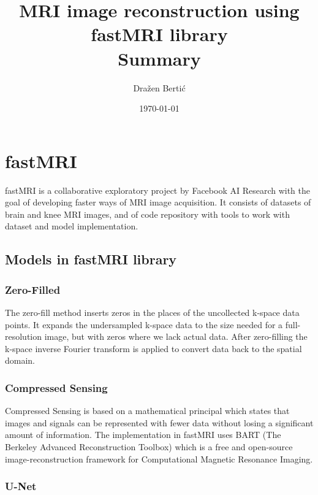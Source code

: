 \documentclass[10pt,a4paper]{article}
\begin{document}
\title{MRI image reconstruction using fastMRI library \\ \vspace{0.5cm} \large Summary}
\author{Dražen Bertić}
\date{\today} %

\maketitle

\section{fastMRI}

fastMRI is a collaborative exploratory project by Facebook AI Research with the goal of developing faster ways of MRI image acquisition. It consists of datasets of brain and knee MRI images, and of code repository with tools to work with dataset and model implementation.

\subsection{Models in fastMRI library}

\subsubsection{Zero-Filled}

The zero-fill method inserts zeros in the places of the uncollected k-space data points. It expands the undersampled k-space data to the size needed for a full-resolution image, but with zeros where we lack actual data. After zero-filling the k-space inverse Fourier transform is applied to convert data back to the spatial domain.

\subsubsection{Compressed Sensing}

Compressed Sensing is based on a mathematical principal which states that images and signals can be represented with fewer data without losing a significant amount of information. The implementation in fastMRI uses BART (The Berkeley Advanced Reconstruction Toolbox) which is a free and open-source image-reconstruction framework for Computational Magnetic Resonance Imaging. 

\subsubsection{U-Net}
\end{document}

